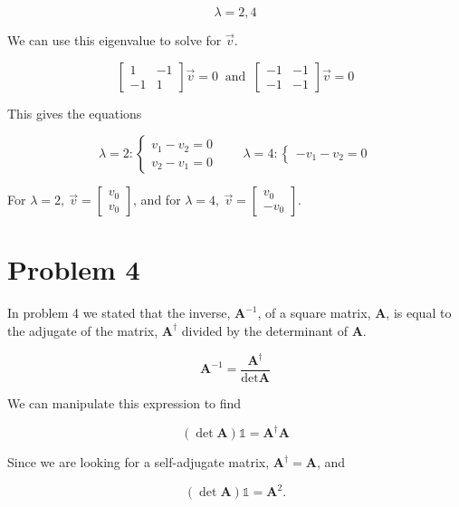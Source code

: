 \documentclass{article}
\begin{document}
$$\boxed{ \lambda = 2, 4 }$$

We can use this eigenvalue to solve for $\vec{v}$. 

$$\begin{bmatrix}
1 	&	-1	\\
-1	&	1	\end{bmatrix}\vec{v} = 0 \ \text{ and } \ 
\begin{bmatrix}
-1 	&	-1	\\
-1	&	-1	\end{bmatrix}\vec{v} = 0 $$ 

This gives the equations

$$ \lambda = 2: \begin{cases} v_1 - v_2 = 0 \\
                              v_2 - v_1 = 0 \end{cases}
\qquad \lambda = 4: \begin{cases}  -v_1 - v_2 = 0 \end{cases} $$

For $\boxed{ \lambda = 2, \ \vec{v} = \begin{bmatrix}v_0 \\ v_0\end{bmatrix} }$, and for $\boxed{ \lambda = 4, \ \vec{v} = \begin{bmatrix}v_0 \\ -v_0\end{bmatrix} }$.




\section*{Problem 4}

In problem 4 we stated that the inverse, $\textbf{A}^{-1}$, of a square matrix, $\textbf{A}$,  is equal to the adjugate of the matrix, $\textbf{A}^{\dagger}$ divided by the determinant of $\textbf{A}$.

$$ \textbf{A}^{-1} = \frac{\textbf{A}^{\dagger}}{\det{\textbf{A}}} $$

We can manipulate this expression to find

$$ (\det{\textbf{A}})\mathbb{1} = \textbf{A}^{\dagger}\textbf{A} $$

Since we are looking for a self-adjugate matrix, $\textbf{A}^{\dagger} = \textbf{A}$, and 

$$ (\det{\textbf{A}})\mathbb{1} = \textbf{A}^2 .$$
\end{document}
